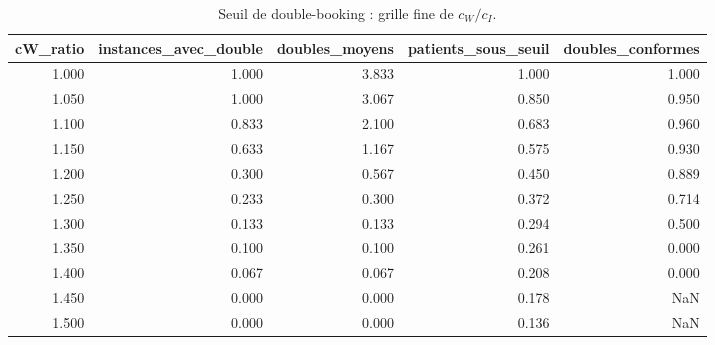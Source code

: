 \begin{table}[htbp]
\caption{Seuil de double-booking : grille fine de $c_W/c_I$.}
\label{tab:threshold}
\begin{tabular}{rrrrr}
\toprule
cW\_ratio & instances\_avec\_double & doubles\_moyens & patients\_sous\_seuil & doubles\_conformes \\
\midrule
1.000 & 1.000 & 3.833 & 1.000 & 1.000 \\
1.050 & 1.000 & 3.067 & 0.850 & 0.950 \\
1.100 & 0.833 & 2.100 & 0.683 & 0.960 \\
1.150 & 0.633 & 1.167 & 0.575 & 0.930 \\
1.200 & 0.300 & 0.567 & 0.450 & 0.889 \\
1.250 & 0.233 & 0.300 & 0.372 & 0.714 \\
1.300 & 0.133 & 0.133 & 0.294 & 0.500 \\
1.350 & 0.100 & 0.100 & 0.261 & 0.000 \\
1.400 & 0.067 & 0.067 & 0.208 & 0.000 \\
1.450 & 0.000 & 0.000 & 0.178 & NaN \\
1.500 & 0.000 & 0.000 & 0.136 & NaN \\
\bottomrule
\end{tabular}
\end{table}
